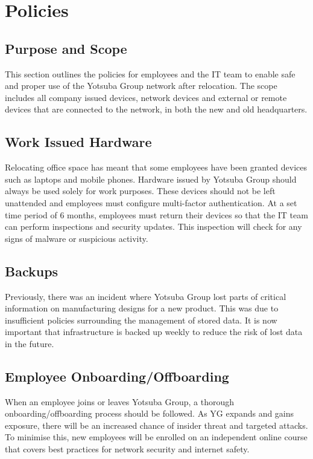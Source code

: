 \chapter{Policies}

\section{Purpose and Scope}
This section outlines the policies for employees and the IT team to enable safe and proper use of the Yotsuba Group network after relocation. The scope includes all company issued devices, network devices and external or remote devices that are connected to the network, in both the new and old headquarters.

\section{Work Issued Hardware}
Relocating office space has meant that some employees have been granted devices such as laptops and mobile phones. Hardware issued by Yotsuba Group should always be used solely for work purposes. These devices should not be left unattended and employees must configure multi-factor authentication. At a set time period of 6 months, employees must return their devices so that the IT team can perform inspections and security updates. This inspection will check for any signs of malware or suspicious activity.

\section{Backups}
Previously, there was an incident where Yotsuba Group lost parts of critical information on manufacturing designs for a new product. This was due to insufficient policies surrounding the management of stored data. It is now important that infrastructure is backed up weekly to reduce the risk of lost data in the future.

\section{Employee Onboarding/Offboarding}
When an employee joins or leaves Yotsuba Group, a thorough onboarding/offboarding process should be followed. As YG expands and gains exposure, there will be an increased chance of insider threat and targeted attacks. To minimise this, new employees will be enrolled on an independent online course that covers best practices for network security and internet safety.

